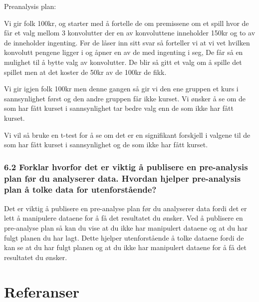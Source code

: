 \documentclass[
  12pt,
  a4paper,
  DIV=11,
  numbers=noendperiod]{scrartcl}
\begin{document}
Preanalysis plan:

Vi gir folk 100kr, og starter med å fortelle de om premissene om et
spill hvor de får et valg mellom 3 konvolutter der en av konvoluttene
inneholder 150kr og to av de inneholder ingenting. Før de låser inn sitt
svar så forteller vi at vi vet hvilken konvolutt pengene ligger i og
åpner en av de med ingenting i seg, De får så en mulighet til å bytte
valg av konvolutter. De blir så gitt et valg om å spille det spillet men
at det koster de 50kr av de 100kr de fikk.

Vi gir igjen folk 100kr men denne gangen så gir vi den ene gruppen et
kurs i sannsynlighet først og den andre gruppen får ikke kurset. Vi
ønsker å se om de som har fått kurset i sannsynlighet tar bedre valg enn
de som ikke har fått kurset.

Vi vil så bruke en t-test for å se om det er en signifikant forskjell i
valgene til de som har fått kurset i sannsynlighet og de som ikke har
fått kurset.

\subsubsection{6.2 Forklar hvorfor det er viktig å publisere en
pre-analysis plan før du analyserer data. Hvordan hjelper pre-analysis
plan å tolke data for
utenforstående?}\label{forklar-hvorfor-det-er-viktig-uxe5-publisere-en-pre-analysis-plan-fuxf8r-du-analyserer-data.-hvordan-hjelper-pre-analysis-plan-uxe5-tolke-data-for-utenforstuxe5ende}

Det er viktig å publisere en pre-analyse plan før du analyserer data
fordi det er lett å manipulere dataene for å få det resultatet du
ønsker. Ved å publisere en pre-analyse plan så kan du vise at du ikke
har manipulert dataene og at du har fulgt planen du har lagt. Dette
hjelper utenforstående å tolke dataene fordi de kan se at du har fulgt
planen og at du ikke har manipulert dataene for å få det resultatet du
ønsker.

\clearpage

\section{Referanser}\label{referanser}
\end{document}
